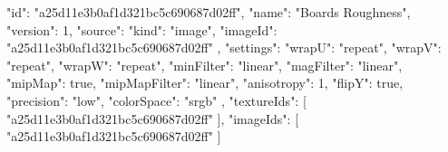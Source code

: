 {
  "id": "a25d11e3b0af1d321bc5c690687d02ff",
  "name": "Boards Roughness",
  "version": 1,
  "source": {
    "kind": "image",
    "imageId": "a25d11e3b0af1d321bc5c690687d02ff"
  },
  "settings": {
    "wrapU": "repeat",
    "wrapV": "repeat",
    "wrapW": "repeat",
    "minFilter": "linear",
    "magFilter": "linear",
    "mipMap": true,
    "mipMapFilter": "linear",
    "anisotropy": 1,
    "flipY": true,
    "precision": "low",
    "colorSpace": "srgb"
  },
  "textureIds": [
    "a25d11e3b0af1d321bc5c690687d02ff"
  ],
  "imageIds": [
    "a25d11e3b0af1d321bc5c690687d02ff"
  ]
}
